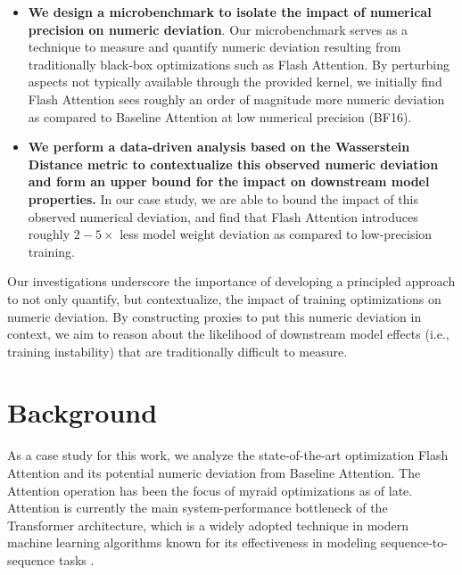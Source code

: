 \begin{itemize}
    \item \textbf{We design a microbenchmark to isolate the impact of numerical precision on numeric deviation}. Our microbenchmark serves as a technique to measure and quantify numeric deviation resulting from traditionally black-box optimizations such as Flash Attention. By perturbing aspects not typically available through the provided kernel, we initially find Flash Attention sees roughly an order of magnitude more numeric deviation as compared to Baseline Attention at low numerical precision (BF16).

    \item \textbf{We perform a data-driven analysis based on the Wasserstein Distance metric to contextualize this observed numeric deviation and form an upper bound for the impact on downstream model properties.} In our case study, we are able to bound the impact of this observed numerical deviation, and find that Flash Attention introduces roughly $2-5\times$ less model weight deviation as compared to low-precision training.

\end{itemize}

Our investigations underscore the importance of developing a principled approach to not only quantify, but contextualize, the impact of training optimizations on numeric deviation. By constructing proxies to put this numeric deviation in context, we aim to reason about the likelihood of downstream model effects (i.e., training instability) that are traditionally difficult to measure. 

\section{Background}
\label{background}

As a case study for this work, we analyze the state-of-the-art optimization Flash Attention and its potential numeric deviation from Baseline Attention. The Attention operation has been the focus of myraid optimizations as of late. Attention is currently the main system-performance bottleneck of the Transformer architecture, which is a widely adopted technique in modern machine learning algorithms known for its effectiveness in modeling sequence-to-sequence tasks \cite{vaswani2023attention}.

